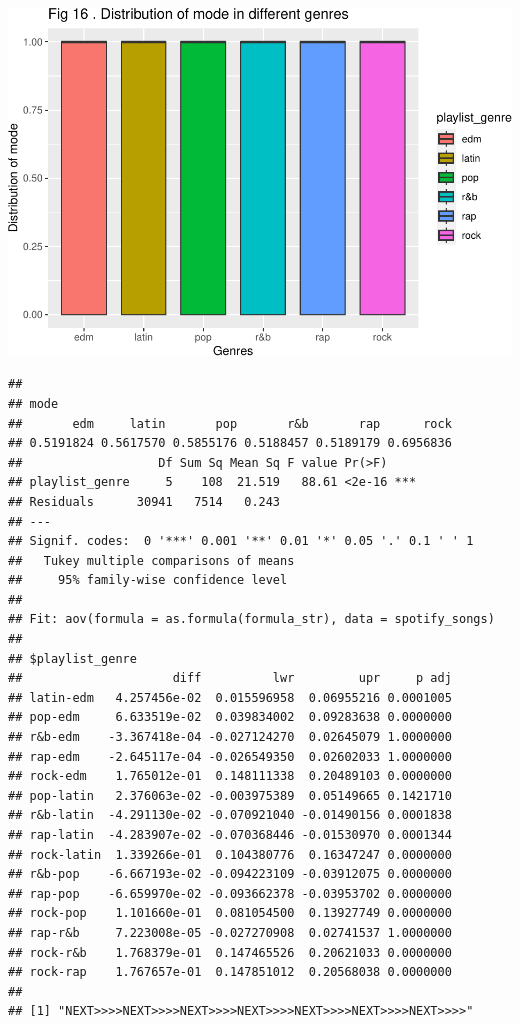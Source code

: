 \documentclass[
]{article}
\begin{document}
\includegraphics{Final-Report_files/figure-latex/unnamed-chunk-14-12.pdf}

\begin{verbatim}
## 
## mode
##       edm     latin       pop       r&b       rap      rock 
## 0.5191824 0.5617570 0.5855176 0.5188457 0.5189179 0.6956836 
##                   Df Sum Sq Mean Sq F value Pr(>F)    
## playlist_genre     5    108  21.519   88.61 <2e-16 ***
## Residuals      30941   7514   0.243                   
## ---
## Signif. codes:  0 '***' 0.001 '**' 0.01 '*' 0.05 '.' 0.1 ' ' 1
##   Tukey multiple comparisons of means
##     95% family-wise confidence level
## 
## Fit: aov(formula = as.formula(formula_str), data = spotify_songs)
## 
## $playlist_genre
##                     diff          lwr         upr     p adj
## latin-edm   4.257456e-02  0.015596958  0.06955216 0.0001005
## pop-edm     6.633519e-02  0.039834002  0.09283638 0.0000000
## r&b-edm    -3.367418e-04 -0.027124270  0.02645079 1.0000000
## rap-edm    -2.645117e-04 -0.026549350  0.02602033 1.0000000
## rock-edm    1.765012e-01  0.148111338  0.20489103 0.0000000
## pop-latin   2.376063e-02 -0.003975389  0.05149665 0.1421710
## r&b-latin  -4.291130e-02 -0.070921040 -0.01490156 0.0001838
## rap-latin  -4.283907e-02 -0.070368446 -0.01530970 0.0001344
## rock-latin  1.339266e-01  0.104380776  0.16347247 0.0000000
## r&b-pop    -6.667193e-02 -0.094223109 -0.03912075 0.0000000
## rap-pop    -6.659970e-02 -0.093662378 -0.03953702 0.0000000
## rock-pop    1.101660e-01  0.081054500  0.13927749 0.0000000
## rap-r&b     7.223008e-05 -0.027270908  0.02741537 1.0000000
## rock-r&b    1.768379e-01  0.147465526  0.20621033 0.0000000
## rock-rap    1.767657e-01  0.147851012  0.20568038 0.0000000
## 
## [1] "NEXT>>>>NEXT>>>>NEXT>>>>NEXT>>>>NEXT>>>>NEXT>>>>NEXT>>>>"
\end{verbatim}
\end{document}
